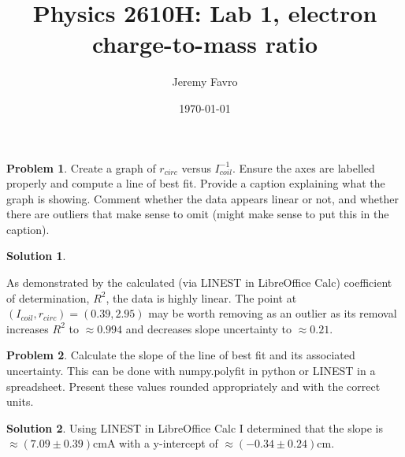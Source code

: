 \documentclass[10pt]{article}
\title{Physics 2610H: Lab 1, electron charge-to-mass ratio}
\author{Jeremy Favro}
\date{\today}
\theoremstyle{definition}
\newtheorem{problem}{Problem}
\newtheorem{soln}{Solution}
\begin{document}
\maketitle

\setcounter{problem}{4}
\setcounter{soln}{4}
\begin{problem}
Create a graph of $r_{circ}$ versus $I_{coil}^{-1}$. Ensure the axes are labelled properly and compute a line of best fit.
Provide a caption explaining what the graph is showing. Comment whether the data appears linear or not,
and whether there are outliers that make sense to omit (might make sense to put this in the caption).
\end{problem}
\begin{soln}~\\
  \begin{center}
  \end{center}
  As demonstrated by the calculated (via LINEST in LibreOffice Calc) coefficient of determination, $R^2$, the data is highly linear. The point at $(I_{coil},r_{circ})=(0.39, 2.95)$ may be worth removing as an
  outlier as its removal increases $R^2$ to $\approx 0.994$ and decreases slope uncertainty to $\approx 0.21$.
\end{soln}

\begin{problem}
Calculate the slope of the line of best fit and its associated uncertainty. This can be done with numpy.polyfit in python or LINEST in a spreadsheet.
Present these values rounded appropriately and with the correct units.
\end{problem}
\begin{soln}
  Using LINEST in LibreOffice Calc I determined that the slope is $\approx(7.09\pm0.39)\unit{\centi\meter\ampere}$ with a y-intercept of $\approx(-0.34\pm0.24)\unit{\centi\meter}$.
\end{soln}
\end{document}
